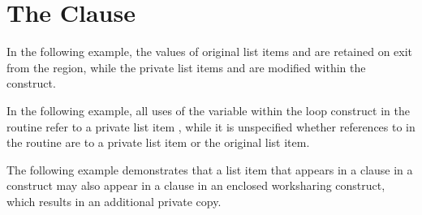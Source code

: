 \pagebreak
\section{The  Clause}
\label{sec:private}

In the following example, the values of original list items  and  
are retained on exit from the  region, while the private list 
items  and  are modified within the  construct. 



In the following example, all uses of the variable  within the loop construct 
in the routine  refer to a private list item , while it is 
unspecified whether references to  in the routine  are to a 
private list item or the original list item.



The following example demonstrates that a list item that appears in a  
 clause in a  construct may also appear in a  
 clause in an enclosed worksharing construct, which results in an additional private 
copy.




